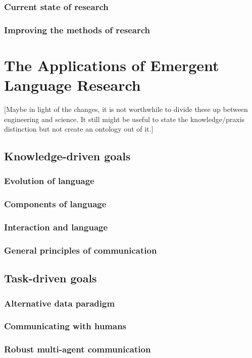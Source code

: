 \documentclass[letterpaper]{report}
\newcommand\cmg[1]{{\color{gray}[#1]}}
\begin{document}
\subsection{Current state of research}

\subsection{Improving the methods of research}


\chapter{The Applications of Emergent Language Research}\label{sec:goals}
\cmg{Maybe in light of the changes, it is not worthwhile to divide these up between engineering and science. It still might be useful to state the knowledge/praxis distinction but not create an ontology out of it.}
\section{Knowledge-driven goals}
\subsection{Evolution of language}
\subsection{Components of language}
\subsection{Interaction and language}
\subsection{General principles of communication}
\section{Task-driven goals}
\subsection{Alternative data paradigm}
\subsection{Communicating with humans}
\subsection{Robust multi-agent communication}
\end{document}
